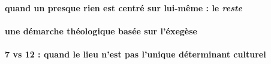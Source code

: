 \paragraph{quand un presque rien est centré sur lui-même  : le \textit{reste}}

\paragraph{une démarche théologique basée sur l'éxegèse}


\paragraph{7 vs 12 : quand le lieu n'est pas l'unique déterminant culturel }

 



 

